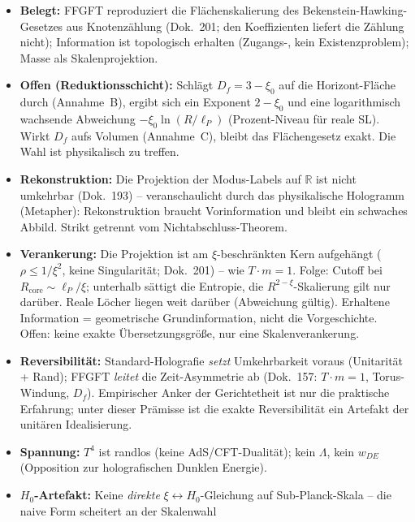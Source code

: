 \begin{itemize}
  \item \textbf{Belegt:} FFGFT reproduziert die Flächenskalierung des
        Bekenstein-Hawking-Gesetzes aus Knotenzählung (Dok.~201; den
        Koeffizienten liefert die Zählung nicht); Information ist topologisch erhalten
        (Zugangs-, kein Existenzproblem); Masse als Skalenprojektion.
  \item \textbf{Offen (Reduktionsschicht):} Schlägt $D_f = 3-\xi_0$ auf die
        Horizont-Fläche durch (Annahme~B), ergibt sich ein Exponent
        $2-\xi_0$ und eine logarithmisch wachsende Abweichung
        $-\xi_0\ln(R/\ell_P)$ (Prozent-Niveau für reale SL). Wirkt $D_f$
        aufs Volumen (Annahme~C), bleibt das Flächengesetz exakt. Die Wahl
        ist physikalisch zu treffen.
  \item \textbf{Rekonstruktion:} Die Projektion der Modus-Labels auf
        $\mathbb{R}$ ist nicht umkehrbar (Dok.~193) -- veranschaulicht durch
        das physikalische Hologramm (Metapher): Rekonstruktion braucht
        Vorinformation und bleibt ein schwaches Abbild. Strikt getrennt vom
        Nichtabschluss-Theorem.
  \item \textbf{Verankerung:} Die Projektion ist am $\xi$-beschränkten Kern
        aufgehängt ($\rho \le 1/\xi^2$, keine Singularität; Dok.~201) --
        wie $T\cdot m=1$. Folge: Cutoff bei $R_\text{core}\sim\ell_P/\xi$;
        unterhalb sättigt die Entropie, die $R^{2-\xi}$-Skalierung gilt nur
        darüber. Reale Löcher liegen weit darüber (Abweichung gültig). Erhaltene
        Information = geometrische Grundinformation, nicht die Vorgeschichte.
        Offen: keine exakte Übersetzungsgröße, nur eine Skalenverankerung.
  \item \textbf{Reversibilität:} Standard-Holografie \emph{setzt}
        Umkehrbarkeit voraus (Unitarität + Rand); FFGFT \emph{leitet} die
        Zeit-Asymmetrie ab (Dok.~157: $T\cdot m=1$, Torus-Windung, $D_f$).
        Empirischer Anker der Gerichtetheit ist nur die praktische Erfahrung;
        unter dieser Prämisse ist die exakte Reversibilität ein Artefakt der
        unitären Idealisierung.
  \item \textbf{Spannung:} $T^4$ ist randlos (keine AdS/CFT-Dualität); kein
        $\Lambda$, kein $w_{DE}$ (Opposition zur holografischen Dunklen Energie).
  \item \textbf{$H_0$-Artefakt:} Keine \emph{direkte} $\xi\leftrightarrow H_0$-Gleichung
        auf Sub-Planck-Skala -- die naive Form scheitert an der Skalenwahl

\end{itemize}
